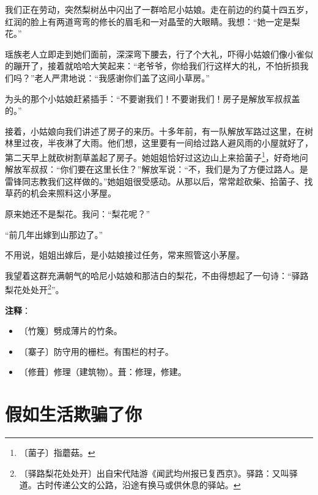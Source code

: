\documentclass[12pt,UTF-8,openany]{ctexbook}
\begin{document}
\begin{normalsize}
    我们正在劳动，突然梨树丛中闪出了一群哈尼小姑娘。走在前边的约莫十四五岁，红润的脸上有两道弯弯的修长的眉毛和一对晶莹的大眼睛。我想：“她一定是梨花。”
    
    瑶族老人立即走到她们面前，深深弯下腰去，行了个大礼，吓得小姑娘们像小雀似的蹦开了，接着就哈哈大笑起来：“老爷爷，你给我们行这样大的礼，不怕折损我们吗？”老人严肃地说：“我感谢你们盖了这间小草房。”
    
    为头的那个小姑娘赶紧插手：“不要谢我们！不要谢我们！房子是解放军叔叔盖的。”
    
    接着，小姑娘向我们讲述了房子的来历。十多年前，有一队解放军路过这里，在树林里过夜，半夜淋了大雨。他们想，这里要有一间给过路人避风雨的小屋就好了，第二天早上就砍树割草盖起了房子。她姐姐恰好过这边山上来拾菌子\footnote{〔菌子〕指蘑菇。}，好奇地问解放军叔叔：“你们要在这里长住？”解放军说：“不，我们是为了方便过路人。是雷锋同志教我们这样做的。”她姐姐很受感动。从那以后，常常趁砍柴、拾菌子、找草药的机会来照料这小茅屋。
    
    原来她还不是梨花。我问：“梨花呢？”
    
    “前几年出嫁到山那边了。”
    
    不用说，姐姐出嫁后，是小姑娘接过任务，常来照管这小茅屋。
    
    我望着这群充满朝气的哈尼小姑娘和那洁白的梨花，不由得想起了一句诗：“驿路梨花处处开\footnote{〔驿路梨花处处开〕出自宋代陆游《闻武均州报已复西京》。驿路：又叫驿道。古时传递公文的公路，沿途有换马或供休息的驿站。}”。
    
\end{normalsize}


\newpage

\textbf{注释}：

\vspace{-1em}

\begin{itemize}
    \setlength\itemsep{-0.2em}
    \item 〔竹篾〕劈成薄片的竹条。
    \item 〔寨子〕防守用的栅栏。有围栏的村子。
    \item 〔修葺〕修理（建筑物）。葺：修理，修建。
\end{itemize}

\chapter{假如生活欺骗了你}
\end{document}
